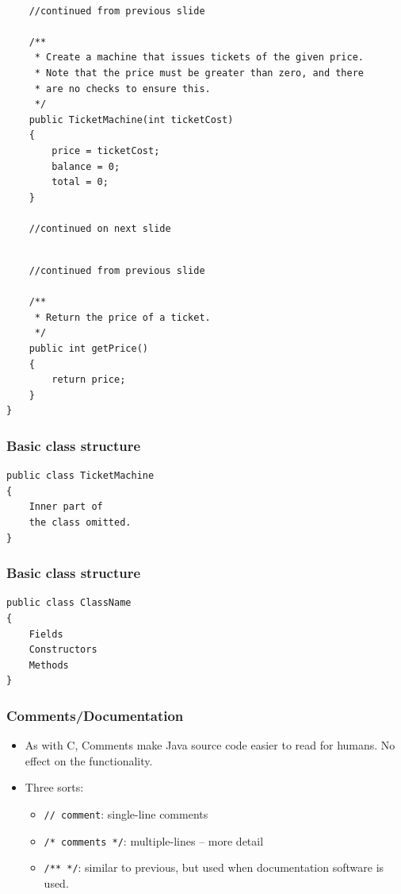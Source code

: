 \documentclass{beamer}
\begin{document}
\begin{frame}[fragile]
\tiny
\begin{lstlisting}

    //continued from previous slide

    /**
     * Create a machine that issues tickets of the given price.
     * Note that the price must be greater than zero, and there
     * are no checks to ensure this.
     */
    public TicketMachine(int ticketCost)
    {
        price = ticketCost;
        balance = 0;
        total = 0;
    }

    //continued on next slide
\end{lstlisting}
\end{frame}

\begin{frame}[fragile]
\tiny
\begin{lstlisting}

    //continued from previous slide

    /**
     * Return the price of a ticket.
     */
    public int getPrice()
    {
        return price;
    }
}
\end{lstlisting}
\end{frame}

\begin{frame}[fragile]
\frametitle{Basic class structure}
\begin{lstlisting}
public class TicketMachine
{
    Inner part of 
    the class omitted.
}
\end{lstlisting}
\end{frame}

\begin{frame}[fragile]
\frametitle{Basic class structure}
\begin{lstlisting}
public class ClassName
{
    Fields
    Constructors
    Methods
} 
\end{lstlisting}
\end{frame}

\begin{frame}
\frametitle{Comments/Documentation}
\begin{itemize}
\item As with C, Comments make Java source code easier to read for humans. No effect on the functionality.
\item Three sorts:
\begin{itemize}
\item \lstinline!// comment!: single-line comments
\item \lstinline!/* comments */!: multiple-lines – more detail
\item \lstinline!/** */!: similar to previous, but used when documentation software is used.
\end{itemize}
\end{itemize}
\end{frame}
\end{document}
